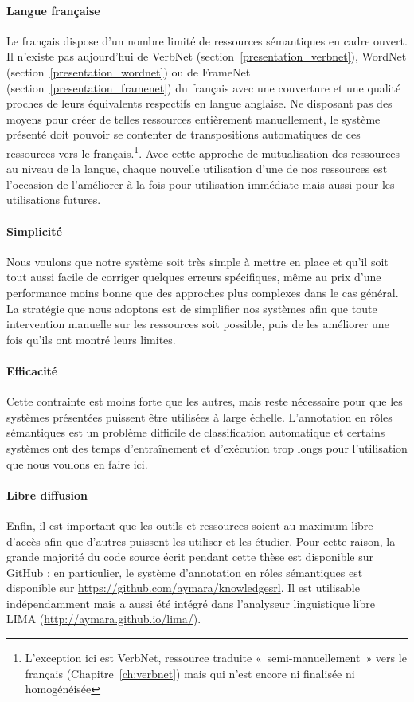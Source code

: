 \paragraph{Langue française} Le français dispose d'un nombre limité de
ressources sémantiques en cadre ouvert. Il n'existe pas aujourd'hui de VerbNet
(section~\ref{presentation_verbnet}), WordNet
(section~\ref{presentation_wordnet}) ou de FrameNet
(section~\ref{presentation_framenet}) du français avec une couverture et une
qualité proches de leurs équivalents respectifs en langue anglaise. Ne
disposant pas des moyens pour créer de telles ressources entièrement
manuellement, le système présenté doit pouvoir se contenter de transpositions
automatiques de ces ressources vers le français.\footnote{L'exception ici est
VerbNet, ressource traduite «~semi-manuellement~» vers le français
(Chapitre~\ref{ch:verbnet}) mais qui n'est encore ni finalisée ni
homogénéisée}. Avec cette approche de mutualisation des ressources au niveau de
la langue, chaque nouvelle utilisation d'une de nos ressources est l'occasion
de l'améliorer à la fois pour utilisation immédiate mais aussi pour les
utilisations futures.

\paragraph{Simplicité} Nous voulons que notre système soit très simple à mettre
en place et qu'il soit tout aussi facile de corriger quelques erreurs
spécifiques, même au prix d'une performance moins bonne que des approches plus
complexes dans le cas général. La stratégie que nous adoptons est de simplifier
nos systèmes afin que toute intervention manuelle sur les ressources soit
possible, puis de les améliorer une fois qu'ils ont montré leurs limites.

\paragraph{Efficacité} Cette contrainte est moins forte que les autres, mais
reste nécessaire pour que les systèmes présentées puissent être utilisées à
large échelle. L'annotation en rôles sémantiques est un problème difficile de
classification automatique et certains systèmes ont des temps d'entraînement et
d'exécution trop longs pour l'utilisation que nous voulons en faire ici.

\paragraph{Libre diffusion} Enfin, il est important que les outils et
ressources soient au maximum libre d'accès afin que d'autres puissent les
utiliser et les étudier. Pour cette raison, la grande majorité du code source
écrit pendant cette thèse est disponible sur GitHub : en particulier, le
système d'annotation en rôles sémantiques est disponible sur
\url{https://github.com/aymara/knowledgesrl}. Il est utilisable indépendamment
mais a aussi été intégré dans l'analyseur linguistique libre LIMA
(\url{http://aymara.github.io/lima/}).

